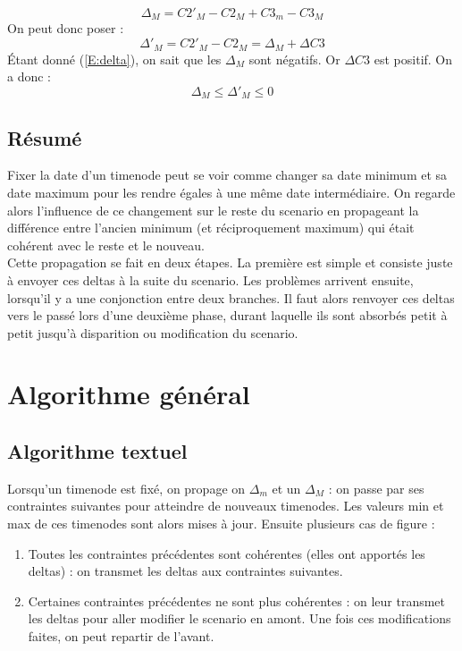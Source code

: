 \documentclass[10pt,a4paper]{article}
\begin{document}
	\begin{equation}
		\Delta{}_M = C2'_M - C2_M + C3_m - C3_M \nonumber
	\end{equation}
On peut donc poser : 
	\begin{equation}
		\Delta{'}_M = C2'_M - C2_M = \Delta{}_M + \Delta{C3} 
	\end{equation}
Étant donné (\ref{E:delta}), on sait que les $\Delta{}_M$ sont négatifs. Or $\Delta{C3}$ est positif. On a donc : 
	\begin{equation}
		\Delta{}_M  \leq \Delta{'}_M  \leq 0
	\end{equation}

	\subsection{Résumé}

Fixer la date d'un timenode peut se voir comme changer sa date minimum et sa date maximum pour les rendre égales à une même date intermédiaire. On regarde alors l'influence de ce changement sur le reste du scenario en propageant la différence entre l'ancien minimum (et réciproquement maximum) qui était cohérent avec le reste et le nouveau. \\

Cette propagation se fait en deux étapes. La première est simple et consiste juste à envoyer ces deltas à la suite du scenario. Les problèmes arrivent ensuite, lorsqu'il y a une conjonction entre deux branches. Il faut alors renvoyer ces deltas vers le passé lors d'une deuxième phase, durant laquelle ils sont absorbés petit à petit jusqu'à disparition ou modification du scenario.

\section{Algorithme général}
	\subsection{Algorithme textuel}

Lorsqu'un timenode est fixé, on propage on $\Delta{}_m$ et un $\Delta{}_M$ : on passe par ses contraintes suivantes pour atteindre de nouveaux timenodes. Les valeurs min et max de ces timenodes sont alors mises à jour. Ensuite plusieurs cas de figure : 
	\begin{enumerate}
		\item Toutes les contraintes précédentes sont cohérentes (elles ont apportés les deltas) : on transmet les deltas aux contraintes suivantes.
		\item Certaines contraintes précédentes ne sont plus cohérentes : on leur transmet les deltas pour aller modifier le scenario en amont. Une fois ces modifications faites, on peut repartir de l'avant.
	\end{enumerate}
\end{document}
